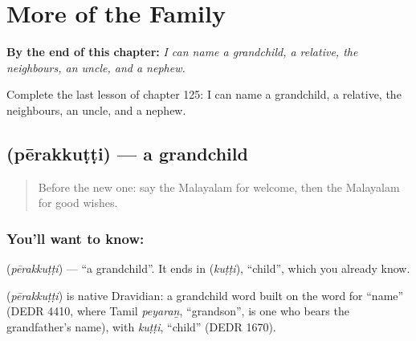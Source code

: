 
\chapter{More of the Family}
\label{ch:ml-more-of-the-family}

\begin{chapteropening}
\textbf{By the end of this chapter:} \emph{I can name a grandchild, a relative, the neighbours, an uncle, and a nephew.}

Complete the last lesson of chapter 125: I can name a grandchild, a relative, the neighbours, an uncle, and a nephew.
\end{chapteropening}

\section[\texorpdfstring{\ml{പേരക്കുട്ടി} (pērakkuṭṭi)}{പേരക്കുട്ടി (pērakkuṭṭi)}]{ (pērakkuṭṭi) — a grandchild}

\label{lesson:ML-C125-grandchild}



\begin{quote}
Before the new one: say the Malayalam for welcome, then the Malayalam for good wishes.
\end{quote}

\subsection*{You'll want to know: }
\textbf{} (\emph{pērakkuṭṭi}) — \textquotedblleft{}a grandchild\textquotedblright{}. It ends in \textbf{} (\emph{kuṭṭi}), \textquotedblleft{}child\textquotedblright{}, which you already know.

\begin{cousinweb}
\textbf{} (\emph{pērakkuṭṭi}) is native Dravidian: a grandchild word built on the word for \textquotedblleft{}name\textquotedblright{} (DEDR 4410, where Tamil \emph{peyaraṉ}, \textquotedblleft{}grandson\textquotedblright{}, is one who bears the grandfather's name), with \emph{kuṭṭi}, \textquotedblleft{}child\textquotedblright{} (DEDR 1670).
\end{cousinweb}


